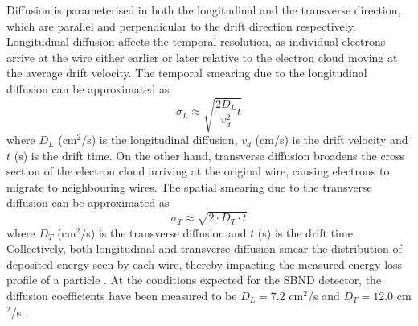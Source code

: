 Diffusion is parameterised in both the longitudinal and the transverse direction, which are parallel and perpendicular to the drift direction respectively.
Longitudinal diffusion affects the temporal resolution, as individual electrons arrive at the wire either earlier or later relative to the electron cloud moving at the average drift velocity.
The temporal smearing due to the longitudinal diffusion can be approximated as \cite{uboone_diff} 
\begin{equation}
        \sigma_{L} \approx \sqrt{\frac{2D_L}{v^{2}_{d}}t}
\end{equation}
where $D_L$ (cm$^2$/s) is the longitudinal diffusion, $v_{d}$ (cm/s) is the drift velocity and $t$ (s) is the drift time.
On the other hand, transverse diffusion broadens the cross section of the electron cloud arriving at the original wire, causing electrons to migrate to neighbouring wires.
The spatial smearing due to the transverse diffusion can be approximated as \cite{GrayDiffusion}
\begin{equation}
        \sigma_T \approx \sqrt{2 \cdot D_T \cdot t}
\end{equation}
where $D_T$ (cm$^2$/s) is the transverse diffusion and $t$ (s) is the drift time.
Collectively, both longitudinal and transverse diffusion smear the distribution of deposited energy seen by each wire, thereby impacting the measured energy loss profile of a particle \cite{GrayDiffusion}.
At the conditions expected for the SBND detector, the diffusion coefficients have been measured to be $D_{L} = 7.2 $ cm$^{2}$/s and $D_T = 12.0 $ cm$^{2}$/s \cite{drift_vel}.


